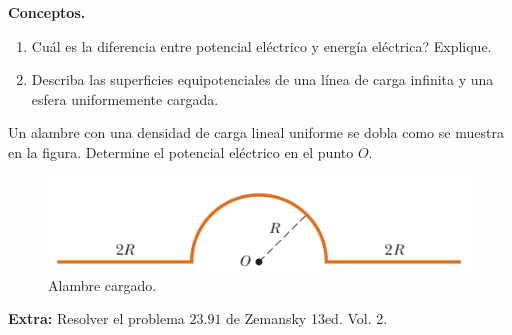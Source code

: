 \begin{mdframed}[style=warning]
	\begin{ejercicio}
		\textbf{Conceptos.}
		\begin{enumerate}
			\item Cuál es la diferencia entre potencial eléctrico y energía eléctrica? Explique.
			\item Describa las superficies equipotenciales de una línea de carga infinita y una esfera uniformemente cargada.
		\end{enumerate}
	\end{ejercicio}
\end{mdframed}






\begin{mdframed}[style=warning]
	\begin{ejercicio}
		Un alambre con una densidad de carga lineal uniforme se dobla como se muestra en la figura. Determine el potencial eléctrico en el punto $O$.
		\begin{figure}[H]
			\centering
			\includegraphics[scale=0.35]{./img/p1.png}
			\caption{Alambre cargado.}
			\label{p1}
		\end{figure}
	\end{ejercicio}
\end{mdframed}



\begin{mdframed}[style=warning]
	\begin{ejercicio}
		\textbf{Extra:} Resolver el problema $23.91$ de Zemansky 13ed. Vol. 2.
	\end{ejercicio}
\end{mdframed}





















































